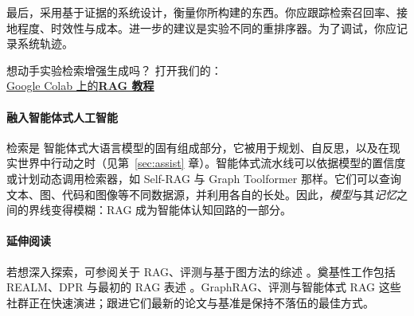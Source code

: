 最后，采用基于证据的系统设计，衡量你所构建的东西。你应跟踪检索召回率、接地程度、时效性与成本。进一步的建议是实验不同的重排序器。为了调试，你应记录系统轨迹。



\begin{tcolorbox}[
    colback=blue!10!white,
    colframe=blue!85!black,
    title={\faRocket\quad 自己动手试试！},
    fonttitle=\bfseries,
    coltitle=white,
    boxrule=1pt,
    arc=4pt,
    left=5pt,
    right=5pt,
    top=5pt,
    bottom=5pt,
    enhanced
]
想动手实验检索增强生成吗？  
打开我们的：\\ 
\href{https://colab.research.google.com/github/Agentic-LLMs/Agentic-AI-tutorials/blob/main/rag_tutorial.ipynb}{\faCode\quad Google Colab 上的\textbf{RAG 教程}}
\end{tcolorbox}

\paragraph{融入智能体式人工智能}  检索是%
智能体式大语言模型的固有组成部分，它被用于规划、自反思，以及在现实世界中行动之时（见第~\ref{sec:assist} 章）。智能体式流水线可以依据模型的置信度或计划动态调用检索器，如 Self-RAG 与 Graph Toolformer 那样。它们可以查询文本、图、代码和图像等不同数据源，并利用各自的长处。因此，{\em 模型}与其{\em 记忆}之间的界线变得模糊：RAG 成为智能体认知回路的一部分。

\paragraph{延伸阅读}  若想深入探索，可参阅关于 RAG、评测与基于图方法的综述 \citep{gao2023rag_survey,huang2024rag_survey,yu2024rag_eval,sharma2025rag_survey,peng2024graphrag_survey}。奠基性工作包括 REALM、DPR 与最初的 RAG 表述 \citep{guu2020realm,karpukhin2020dense,lewis2020retrieval}。GraphRAG、评测与智能体式 RAG 这些社群正在快速演进；跟进它们最新的论文与基准是保持不落伍的最佳方式。




